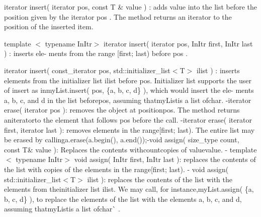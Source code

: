 \begin{DoxyItemize}
\item {\ttfamily iterator insert( iterator pos, const T \& value )} \+: adds value into the list before the position given by the {\ttfamily iterator pos} . The method returns an {\ttfamily iterator} to the position of the inserted item.
\item {\ttfamily template $<$ typename In\+Itr$>$ iterator insert( iterator pos, In\+Itr first, In\+Itr last )} \+: inserts ele-\/ ments from the range {\ttfamily \mbox{[}first; last)} before {\ttfamily pos} .
\item {\ttfamily iterator insert( const\+\_\+iterator pos, std\+::initializer\+\_\+list$<$T$>$ ilist )} \+: inserts elements from the {\ttfamily initializer list ilist} before {\ttfamily pos}{\ttfamily . Initializer list supports the user of insert as in}my\+List.\+insert( pos, \{\textquotesingle{}a\textquotesingle{}, \textquotesingle{}b\textquotesingle{}, \textquotesingle{}c\textquotesingle{}, \textquotesingle{}d\textquotesingle{}\} ){\ttfamily , which would insert the ele-\/ ments a, b, c, and d in the list before}pos{\ttfamily , assuming that}my\+List{\ttfamily is a list of}char{\ttfamily . -\/}iterator erase( iterator pos ){\ttfamily \+: removes the object at position}pos{\ttfamily . The method returns an}iterator{\ttfamily to the element that follows pos before the call. -\/}iterator erase( iterator first, iterator last ){\ttfamily \+: removes elements in the range}\mbox{[}first; last){\ttfamily . The entire list may be erased by calling}a.\+erase(a.\+begin(), a.\+end());{\ttfamily  -\/}void assign( size\+\_\+type count, const T\& value ){\ttfamily \+: Replaces the contents with}count{\ttfamily copies of value}value{\ttfamily . -\/} template $<$ typename In\+Itr$>$ void assign( In\+Itr first, In\+Itr last ){\ttfamily \+: replaces the contents of the list with copies of the elements in the range}\mbox{[}first; last){\ttfamily . -\/} void assign( std\+::initializer\+\_\+list$<$\+T$>$ ilist ){\ttfamily \+: replaces the contents of the list with the elements from the}initializer list ilist{\ttfamily . We may call, for instance,}my\+List.\+assign( \{\textquotesingle{}a\textquotesingle{}, \textquotesingle{}b\textquotesingle{}, \textquotesingle{}c\textquotesingle{}, \textquotesingle{}d\textquotesingle{}\} ){\ttfamily , to replace the elements of the list with the elements a, b, c, and d, assuming that}my\+List{\ttfamily is a list of}char\`{} .
\end{DoxyItemize}

